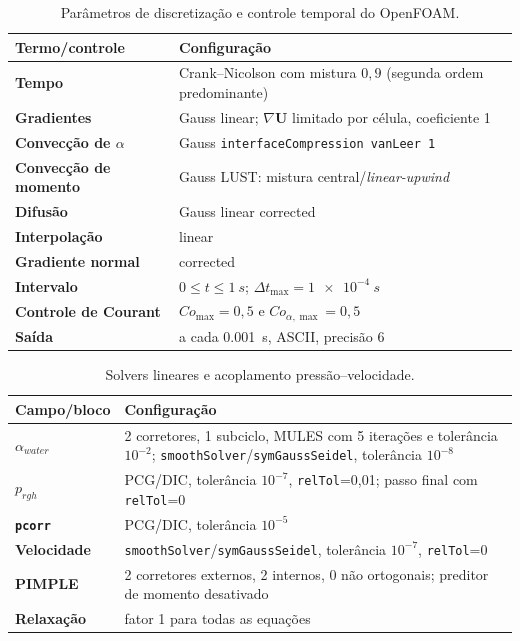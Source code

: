 \documentclass[12pt,a4paper]{article}
\newcommand{\code}[1]{\texttt{#1}}
\begin{document}
\begin{table}[H]
\centering
\caption{Parâmetros de discretização e controle temporal do OpenFOAM.}
\label{tab:discretizacao}
\begin{tabularx}{\textwidth}{>{\bfseries}l X}
\toprule
Termo/controle & Configuração\\
\midrule
Tempo & Crank--Nicolson com mistura $0{,}9$ (segunda ordem predominante)\\
Gradientes & Gauss linear; $\nabla\mathbf{U}$ limitado por célula, coeficiente 1\\
Convecção de $\alpha$ & Gauss \code{interfaceCompression vanLeer 1}\\
Convecção de momento & Gauss LUST: mistura central/\emph{linear-upwind}\\
Difusão & Gauss linear corrected\\
Interpolação & linear\\
Gradiente normal & corrected\\
Intervalo & $0\le t\le\SI{1}{s}$; $\Delta t_{\max}=\SI{1e-4}{s}$\\
Controle de Courant & $Co_{\max}=0{,}5$ e $Co_{\alpha,\max}=0{,}5$\\
Saída & a cada \SI{0.001}{s}, ASCII, precisão 6\\
\bottomrule
\end{tabularx}
\end{table}

\begin{table}[H]
\centering
\caption{Solvers lineares e acoplamento pressão--velocidade.}
\label{tab:solvers}
\begin{tabularx}{\textwidth}{>{\bfseries}l X}
\toprule
Campo/bloco & Configuração\\
\midrule
$\alpha_{water}$ & 2 corretores, 1 subciclo, MULES com 5 iterações e tolerância $10^{-2}$; \code{smoothSolver}/\code{symGaussSeidel}, tolerância $10^{-8}$\\
$ p_{rgh}$ & PCG/DIC, tolerância $10^{-7}$, \code{relTol}=0,01; passo final com \code{relTol}=0\\
\code{pcorr} & PCG/DIC, tolerância $10^{-5}$\\
Velocidade & \code{smoothSolver}/\code{symGaussSeidel}, tolerância $10^{-7}$, \code{relTol}=0\\
PIMPLE & 2 corretores externos, 2 internos, 0 não ortogonais; preditor de momento desativado\\
Relaxação & fator 1 para todas as equações\\
\bottomrule
\end{tabularx}
\end{table}
\end{document}
